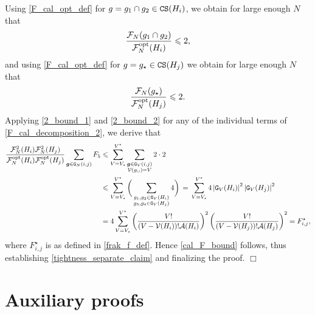 \documentclass[11pt,reqno]{amsart}
\numberwithin{equation}{section}
\newcommand{\abs}[1]{\left\lvert #1 \right\rvert}
\newcommand{\QED}{\hfill $\Box$}
\newcommand{\kb}[1]{\boldsymbol{#1}}
\newcommand{\vk}[1]{\kb{#1}}
\begin{document}
{Using \eqref{F_cal_opt_def} for $g=g_1\cap g_2\in {\tt CS}(H_i)$, we obtain for large enough $N$ that
\begin{align}
    \frac{\mathcal{F}_N(g_1\cap g_2)}{\mathcal{F}^{\rm opt}_N(H_i)} \leqslant 2,\label{2_bound_1}
\end{align}
and using \eqref{F_cal_opt_def} for $g=g_{\star}\in {\tt CS}(H_j)$ we obtain for large enough $N$ that
\begin{align}
    \frac{\mathcal{F}_N(g_{\star})}{\mathcal{F}^{\rm opt}_N(H_j)} \leqslant 2.\label{2_bound_2}
\end{align}
Applying \eqref{2_bound_1} and \eqref{2_bound_2} for any of the individual terms of \eqref{F_cal_decomposition_2}, we derive that 
\begin{align*}
     \frac{\mathcal{F}_N^2(H_i)\mathcal{F}_N^2(H_j)}{\mathcal{F}^{\rm opt}_N(H_i)\mathcal{F}^{\rm opt}_N(H_j)}\sum_{\vk g\in{\tt G}_{N}(i,j)} F_5&\leqslant \sum_{V=V_{\star}}^{V^{\star}}\sum_{\substack{\vk g\in{\tt G}_{V}(i,j) \\ \mathcal{V}(g_{\cup}) = V}}2\cdot 2\\
     &\leqslant \sum_{V=V_{\star}}^{V^{\star}}\bigg(\sum_{\substack{g_1,g_2\in {\tt G}_V(H_i)\\ g_3,g_4\in {\tt G}_V(H_j)}}4\bigg)\,=\, \sum_{V=V_{\star}}^{V^{\star}}4\abs{{\tt G}_V(H_i)}^2\abs{{\tt G}_V(H_j)}^2\\
     &= 4\sum_{V=V_{\star}}^{V^{\star}}\left(\frac{V!}{(V-\mathcal{V}(H_i))!\mathcal{A}(H_i)}\right)^2\left(\frac{V!}{(V-\mathcal{V}(H_j))!\mathcal{A}(H_j)}\right)^2=F^{\star}_{i,j},
\end{align*}
}where $F^{\star}_{i,j}$ is as defined in \eqref{frak_f_def}. Hence \eqref{cal_F_bound} follows, thus establishing \eqref{tightness_separate_claim} {and finalizing the proof}.
\QED

\appendix

\section{{Auxiliary proofs}}\label{section:appendix}
\end{document}
